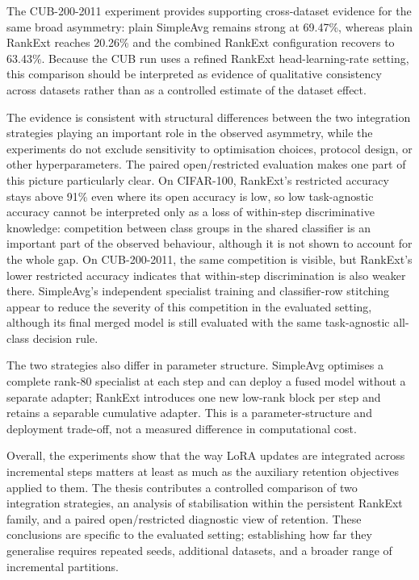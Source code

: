 The CUB-200-2011 experiment provides supporting cross-dataset evidence for
the same broad asymmetry: plain SimpleAvg remains strong at 69.47\%,
whereas plain RankExt reaches 20.26\% and the combined RankExt
configuration recovers to 63.43\%. Because the CUB run uses a refined
RankExt head-learning-rate setting, this comparison should be interpreted
as evidence of qualitative consistency across datasets rather than as a
controlled estimate of the dataset effect.

The evidence is consistent with structural differences between the two
integration strategies playing an important role in the observed
asymmetry, while the experiments do not exclude sensitivity to
optimisation choices, protocol design, or other hyperparameters. The
paired open/restricted evaluation makes one part of this picture
particularly clear. On CIFAR-100, RankExt's restricted accuracy stays
above 91\% even where its open accuracy is low, so low task-agnostic
accuracy cannot be interpreted only as a loss of within-step discriminative
knowledge: competition between class groups in the shared classifier is an
important part of the observed behaviour, although it is not shown to
account for the whole gap. On CUB-200-2011, the same competition is visible,
but RankExt's lower restricted accuracy indicates that within-step
discrimination is also weaker there. SimpleAvg's independent specialist training and classifier-row
stitching appear to reduce the severity of this competition in the
evaluated setting, although its final merged model is still evaluated with
the same task-agnostic all-class decision rule.

The two strategies also differ in parameter structure. SimpleAvg optimises
a complete rank-80 specialist at each step and can deploy a fused model
without a separate adapter; RankExt introduces one new low-rank block per
step and retains a separable cumulative adapter. This is a
parameter-structure and deployment trade-off, not a measured difference in
computational cost.

Overall, the experiments show that the way LoRA updates are integrated
across incremental steps matters at least as much as the auxiliary
retention objectives applied to them. The thesis contributes a controlled
comparison of two integration strategies, an analysis of stabilisation
within the persistent RankExt family, and a paired open/restricted
diagnostic view of retention. These conclusions are specific to the
evaluated setting; establishing how far they generalise requires repeated
seeds, additional datasets, and a broader range of incremental partitions.
